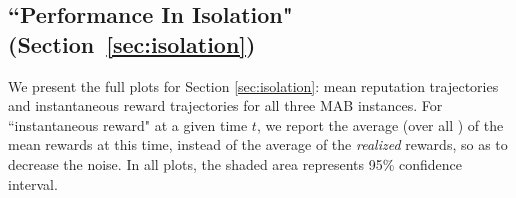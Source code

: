 \documentclass[../competing_bandits_with_appendix.tex]{subfiles}
\begin{document}

\subsection{``Performance In Isolation" (Section~\ref{sec:isolation})}
\label{app:isol}


We present the full plots for Section \ref{sec:isolation}: mean reputation trajectories and instantaneous reward trajectories for all three MAB instances.  For ``instantaneous reward" at a given time $t$, we report the average (over all \MRVs) of the mean rewards at this time, instead of the average of the \emph{realized} rewards, so as to decrease the noise. In all plots, the shaded area represents 95\% confidence interval.
\end{document}
